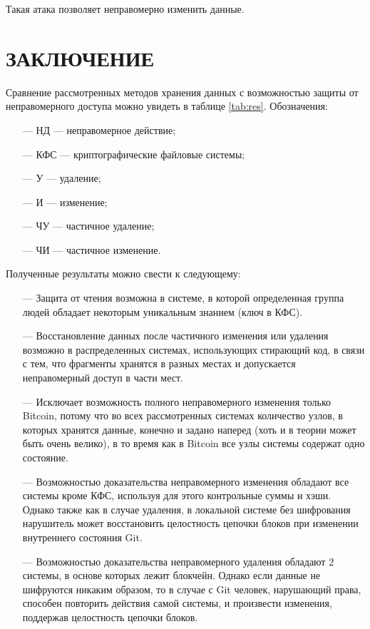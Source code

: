 Такая атака позволяет неправомерно изменить данные.

\pagebreak

\section*{ЗАКЛЮЧЕНИЕ}

Сравнение рассмотренных методов хранения данных с возможностью защиты от неправомерного доступа можно увидеть в таблице \ref{tab:res}. Обозначения:
\begin{itemize}
    \item[---] НД --- неправомерное действие;
    \item[---] КФС --- криптографические файловые системы;
    \item[---] У --- удаление;
    \item[---] И --- изменение;
    \item[---] ЧУ --- частичное удаление;
    \item[---] ЧИ --- частичное изменение.
\end{itemize}

Полученные результаты можно свести к следующему:
\begin{itemize}
    \item[---] Защита от чтения возможна в системе, в которой определенная группа людей обладает некоторым уникальным знанием (ключ в КФС).
    \item[---] Восстановление данных после частичного изменения или удаления возможно в распределенных системах, использующих стирающий код, в связи с тем, что фрагменты хранятся в разных местах и допускается неправомерный доступ в части мест.
    \item[---] Исключает возможность полного неправомерного изменения только Bitcoin, потому что во всех рассмотренных системах количество узлов, в которых хранятся данные, конечно и задано наперед (хоть и в теории может быть очень велико), в то время как в Bitcoin все узлы системы содержат одно состояние.
    \item[---] Возможностью доказательства неправомерного изменения обладают все системы кроме КФС, используя для этого контрольные суммы и хэши. Однако также как в случае удаления, в локальной системе без шифрования нарушитель может восстановить целостность цепочки блоков при изменении внутреннего состояния Git.
    \item[---] Возможностью доказательства неправомерного удаления обладают 2 системы, в основе которых лежит блокчейн. Однако если данные не шифруются никаким образом, то в случае с Git человек, нарушающий права, способен повторить действия самой системы, и произвести изменения, поддержав целостность цепочки блоков.
\end{itemize}

